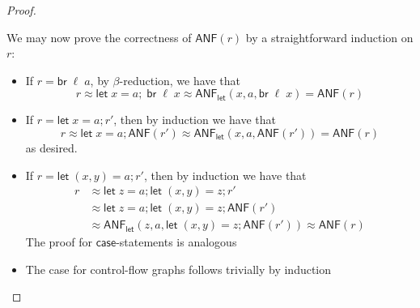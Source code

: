 \documentclass[acmsmall,screen,review]{acmart}
\newcommand{\ms}[1]{\ensuremath{\mathsf{#1}}}
\newcommand{\letexpr}[3]{\ensuremath{\ms{let}\;#1 = #2;\;#3}}
\newcommand{\letstmt}[3]{\ensuremath{\ms{let}\;#1 = #2; #3}}
\newcommand{\brb}[2]{\ms{br}\;#1\;#2}
\newcommand{\teqv}{\approx}
\newcommand{\toanf}[1]{\ms{ANF}(#1)}
\newcommand{\letanf}[3]{\ms{ANF}_{\ms{let}}(#1, #2, #3)}
\begin{document}
\begin{proof}
\begin{itemize}
  \end{itemize}
  We may now prove the correctness of $\toanf{r}$ by a straightforward induction on $r$:
  \begin{itemize}
    \item If $r = \brb{\ell}{a}$, by $\beta$-reduction, we have that
    \begin{equation}
      r \teqv \letexpr{x}{a}{\brb{\ell}{x}} \teqv \letanf{x}{a}{\brb{\ell}{x}} = \toanf{r}
    \end{equation}
    \item If $r = \letstmt{x}{a}{r'}$, then by induction we have that
    \begin{equation}
      r \teqv \letstmt{x}{a}{\toanf{r'}} \teqv \letanf{x}{a}{\toanf{r'}} = \toanf{r}
    \end{equation}
    as desired.
    \item If $r = \letstmt{(x, y)}{a}{r'}$, then by induction we have that
    \begin{equation}
      \begin{aligned}
        r & \teqv \letstmt{z}{a}{\letstmt{(x, y)}{z}{r'}} \\
          & \teqv \letstmt{z}{a}{\letstmt{(x, y)}{z}{\ms{ANF}(r')}} \\
          & \teqv \letanf{z}{a}{\letstmt{(x, y)}{z}{\ms{ANF}(r')}}
            \teqv \toanf{r}
      \end{aligned}
    \end{equation}
    The proof for \ms{case}-statements is analogous
    \item The case for control-flow graphs follows trivially by induction
  \end{itemize}
\end{proof}

\label{proof:ssa-conversion}
\end{document}
